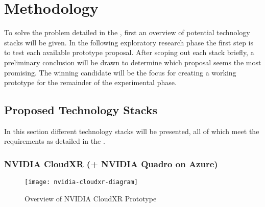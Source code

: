 \section{Methodology}

To solve the problem detailed in the , first an overview of potential technology stacks will be given. In the following exploratory research phase the first step is to test each available prototype proposal. After scoping out each stack briefly, a preliminary conclusion will be drawn to determine which proposal seems the most promising. The winning candidate will be the focus for creating a working prototype for the remainder of the experimental phase.

\subsection{Proposed Technology Stacks}
In this section different technology stacks will be presented, all of which meet the requirements as detailed in the .

\subsubsection{NVIDIA CloudXR (+ NVIDIA Quadro on Azure)}
\begin{figure}[h!]
\caption{Overview of NVIDIA CloudXR Prototype \parencite{cloudxr}}
\label{fig:pr0}
\texttt{[image: nvidia-cloudxr-diagram]}
\end{figure}

